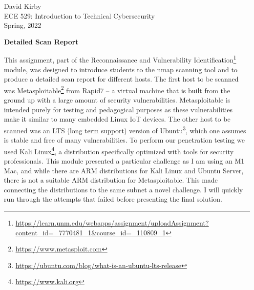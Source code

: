 \documentclass[12pt]{article}
\begin{document}
\setmainfont{SF Pro Text}
\setsansfont{SF Pro Text}
\setmonofont{SF Mono}
\renewcommand{\familydefault}{\sfdefault}

\hypersetup{
    linkcolor=CrispBlue,
    urlcolor=CrispBlue,
    breaklinks=true
}

\noindent David Kirby\\
ECE 529: Introduction to Technical Cybersecurity\\
Spring, 2022
\begin{center}
    \large\bfseries Detailed Scan Report
\end{center}

This assignment, part of the Reconnaissance and Vulnerability Identification\footnote{\href{https://learn.unm.edu/webapps/assignment/uploadAssignment?content_id=_7770481_1&course_id=_110809_1&user_id=_196414_1}{https://learn.unm.edu/webapps/assignment/uploadAssignment?content\_id=\_7770481\_1\&course\_id=\_110809\_1}} module, was designed to introduce students to the nmap scanning tool and to produce a detailed scan report for different hosts. The first host to be scanned was Metasploitable\footnote{\href{https://www.metasploit.com}{https://www.metasploit.com}} from Rapid7 -- a virtual machine that is built from the ground up with a large amount of security vulnerabilities. Metasploitable is intended purely for testing and pedagogical purposes as these vulnerabilities make it similar to many embedded Linux IoT devices. The other host to be scanned was an LTS (long term support) version of Ubuntu\footnote{\href{https://ubuntu.com/blog/what-is-an-ubuntu-lts-release}{https://ubuntu.com/blog/what-is-an-ubuntu-lts-release}}, which one assumes is stable and free of many vulnerabilities. To perform our penetration testing we used Kali Linux\footnote{\href{https://www.kali.org}{https://www.kali.org}}, a distribution specifically optimized with tools for security professionals. This module presented a particular challenge as I am using an M1 Mac, and while there are ARM distributions for Kali Linux and Ubuntu Server, there is not a suitable ARM distribution for Metasploitable. This made connecting the distributions to the same subnet a novel challenge. I will quickly run through the attempts that failed before presenting the final solution.
\end{document}
